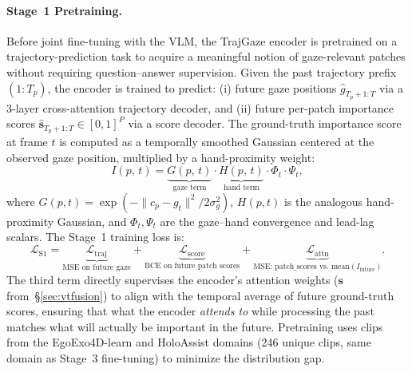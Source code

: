 \paragraph{Stage~1 Pretraining.}
\label{sec:stage1}
Before joint fine-tuning with the VLM, the TrajGaze encoder is pretrained on a
trajectory-prediction task to acquire a meaningful notion of gaze-relevant patches
without requiring question--answer supervision.
Given the past trajectory prefix $(1{:}T_p)$, the encoder is trained to predict:
(i) future gaze positions $\hat{g}_{T_p+1:T}$ via a 3-layer cross-attention
trajectory decoder, and
(ii) future per-patch importance scores $\hat{\mathbf{s}}_{T_p+1:T} \in [0,1]^{P}$
via a score decoder.
The ground-truth importance score at frame $t$ is computed as a temporally
smoothed Gaussian centered at the observed gaze position, multiplied by a
hand-proximity weight:
\begin{equation}
    I(p,\,t) =
        \underbrace{G(p,\,t)}_{\text{gaze term}}
        \cdot
        \underbrace{H(p,\,t)}_{\text{hand term}}
        \cdot \Phi_t \cdot \Psi_t,
\end{equation}
where $G(p,t) = \exp(-\|c_p - g_t\|^2 / 2\sigma_g^2)$,
$H(p,t)$ is the analogous hand-proximity Gaussian, and
$\Phi_t, \Psi_t$ are the gaze--hand convergence and lead-lag scalars.
The Stage~1 training loss is:
\begin{equation}
    \mathcal{L}_{\mathrm{S1}} =
        \underbrace{\mathcal{L}_{\mathrm{traj}}}_{\text{MSE on future gaze}}
        + \underbrace{\mathcal{L}_{\mathrm{score}}}_{\text{BCE on future patch scores}}
        + \underbrace{\mathcal{L}_{\mathrm{attn}}}_{\text{MSE: patch\_scores vs.\ mean}(I_{\mathrm{future}})}.
\end{equation}
The third term directly supervises the encoder's attention weights
($\mathbf{s}$ from~\S\ref{sec:vtfusion}) to align with the temporal average of
future ground-truth scores, ensuring that what the encoder \emph{attends to}
while processing the past matches what will actually be important in the future.
Pretraining uses clips from the EgoExo4D-learn and HoloAssist domains (246 unique clips,
same domain as Stage~3 fine-tuning) to minimize the distribution gap.
